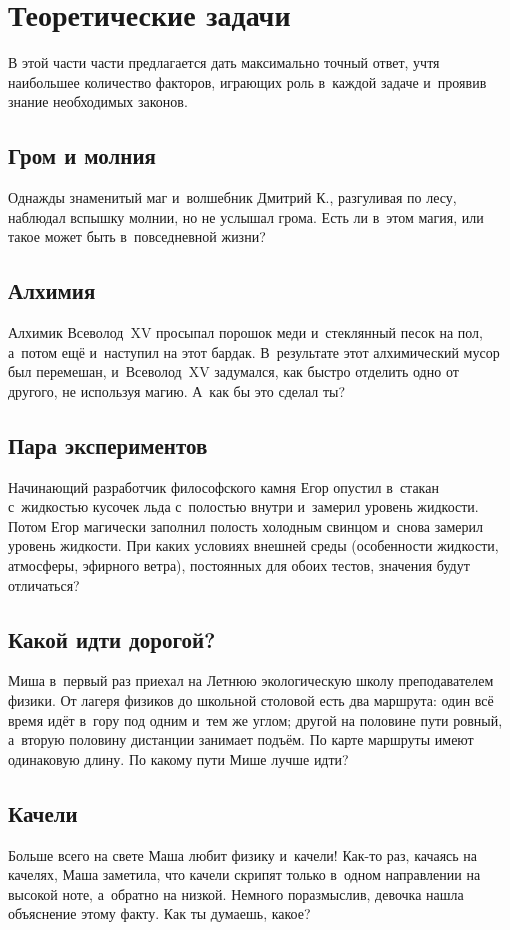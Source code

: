 \documentclass[a4paper,12pt]{article}
\begin{document}
\section{Теоретические задачи}

В этой части части предлагается
дать максимально точный ответ, учтя наибольшее количество факторов, играющих роль в~каждой
задаче и~проявив знание необходимых законов.

\subsection{Гром и молния}
Однажды знаменитый маг и~волшебник Дмитрий К., разгуливая по лесу, наблюдал вспышку молнии,
но не услышал грома. Есть ли в~этом магия, или такое может быть в~повседневной жизни?

\subsection{Алхимия}
Алхимик Всеволод~XV просыпал порошок меди и~стеклянный песок на пол, а~потом ещё
и~наступил на этот бардак. В~результате этот алхимический мусор был перемешан,
и~Всеволод~XV задумался, как быстро отделить одно от другого, не используя магию.
А~как бы это сделал ты?

\subsection{Пара экспериментов}
Начинающий разработчик философского камня Егор опустил в~стакан с~жидкостью кусочек
льда с~полостью внутри и~замерил уровень жидкости. Потом Егор магически заполнил
полость холодным свинцом и~снова замерил уровень жидкости. При каких условиях
внешней среды (особенности жидкости, атмосферы, эфирного ветра), постоянных
для обоих тестов, значения будут отличаться?

\subsection{Какой идти дорогой?}
Миша в~первый раз приехал на Летнюю экологическую школу преподавателем физики.
От лагеря физиков до школьной столовой есть два маршрута: один всё время идёт в~гору
под одним и~тем же углом; другой на половине пути ровный, а~вторую половину
дистанции занимает подъём. По карте маршруты имеют одинаковую длину.
По какому пути Мише лучше идти?

\subsection{Качели}
Больше всего на свете Маша любит физику и~качели! Как-то раз, качаясь на качелях,
Маша заметила, что качели скрипят только в~одном направлении на высокой ноте,
а~обратно на низкой. Немного поразмыслив, девочка нашла объяснение этому факту.
Как ты думаешь, какое?
\end{document}
